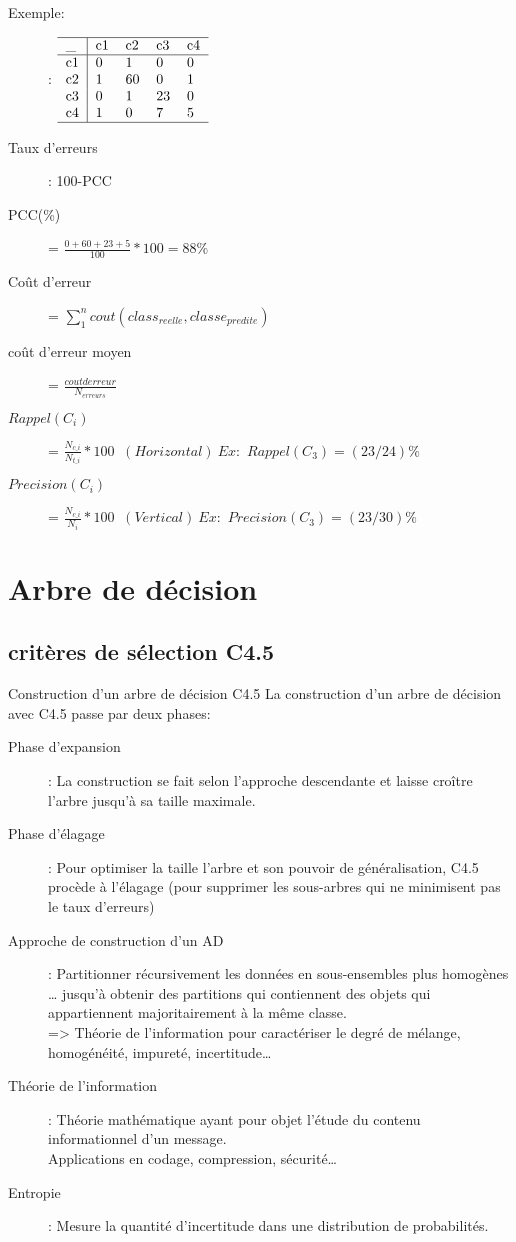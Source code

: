 Exemple:\\
\begin{description}
\item[]: $
  \begin{tabular}{l|llll}
  \hline
  \_  & c1 & c2 & c3 & c4 \\
  \hline
   c1 & 0  & 1  &  0 & 0  \\
   c2 & 1  & 60 &  0 & 1  \\
   c3 & 0  & 1  & 23 & 0  \\
   c4 & 1  & 0  &  7 & 5  \\
  \hline
  \end{tabular}$
\item[Taux d'erreurs]: 100-PCC
\item[PCC(\%)] = $ \frac{0+60+23+5}{100} * 100 = 88\% $ 
\item[Coût d'erreur] = $\sum_1^n cout(class_{reelle}, classe_{predite})$
\item[coût d'erreur moyen] = $\frac{cout derreur}{N_{erreurs}}$
\item[$Rappel(C_i)$] = $\frac{N_{c\_i}}{N_{t\_i}} * 100$ $\ (Horizontal)\ Ex:$ $Rappel(C_3)=(23/24)\%$
\item[$Precision(C_i)$] = $\frac{N_{c\_i}}{N_{i}} * 100$ $\ (Vertical)\ Ex:$ $Precision(C_3)=(23/30)\%$
\end{description}


\chapter{Arbre de décision}
\section{critères de sélection C4.5}

Construction d’un arbre de décision C4.5  La construction d'un arbre de décision avec C4.5 passe par deux phases:  
\begin{description}
\item[Phase d'expansion]: La construction se fait selon l'approche descendante et laisse croître l'arbre jusqu'à sa taille maximale.  
\item[Phase d'élagage]: Pour optimiser la taille l'arbre et son pouvoir de généralisation, C4.5 procède à l'élagage (pour supprimer les sous-arbres qui ne minimisent pas le taux d'erreurs)
\item[Approche de construction d’un AD]: Partitionner récursivement les données en sous-ensembles plus homogènes  … jusqu’à obtenir des partitions qui contiennent des objets qui appartiennent majoritairement à la même classe. \\
=> Théorie de l’information pour caractériser le degré de mélange, homogénéité, impureté, incertitude…
\item[Théorie de l’information]: Théorie mathématique ayant pour objet l’étude du contenu informationnel d’un message. \\
 Applications en codage, compression, sécurité… 
\item[Entropie]: Mesure la quantité d’incertitude dans une distribution de probabilités.
\end{description}

